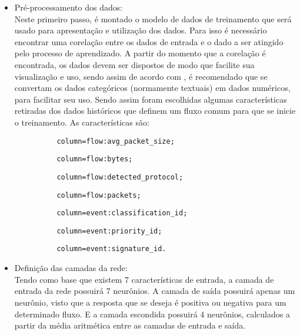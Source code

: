     \begin{itemize}
        \item Pré-processamento dos dados: \\ Neste primeiro passo, é montado o modelo de dados de treinamento que será usado para apresentação e utilização dos dados. Para isso é necessário encontrar uma corelação entre os dados de entrada e o dado a ser atingido pelo processo de aprendizado. A partir do momento que a corelação é encontrada, os dados devem ser dispostos de modo que facilite sua visualização e uso, sendo assim de acordo com \cite{brink2015}, é recomendado que se convertam os dados categóricos (normamente textuais) em dados numéricos, para facilitar seu uso. Sendo assim foram escolhidas algumas características retiradas dos dados históricos que definem um fluxo comum para que se inicie o treinamento. As características são:
        \\
        \begin{lstlisting}
          column=flow:avg_packet_size;
        \end{lstlisting}

        \begin{lstlisting}
          column=flow:bytes;
        \end{lstlisting}

        \begin{lstlisting}
          column=flow:detected_protocol;
        \end{lstlisting}

        \begin{lstlisting}
          column=flow:packets;
        \end{lstlisting}

        \begin{lstlisting}
          column=event:classification_id;
        \end{lstlisting}

        \begin{lstlisting}
          column=event:priority_id;
        \end{lstlisting}

        \begin{lstlisting}
          column=event:signature_id.
        \end{lstlisting}

        \item Definição das camadas da rede: \\ Tendo como base que existem 7 características de entrada, a camada de entrada da rede possuirá 7 neurônios. A camada de saída possuirá apenas um neurônio, visto que a resposta que se deseja é positiva ou negativa para um determinado fluxo. E a camada escondida possuirá 4 neurônios, calculados a partir da média aritmética entre as camadas de entrada e saída.


\end{itemize}
